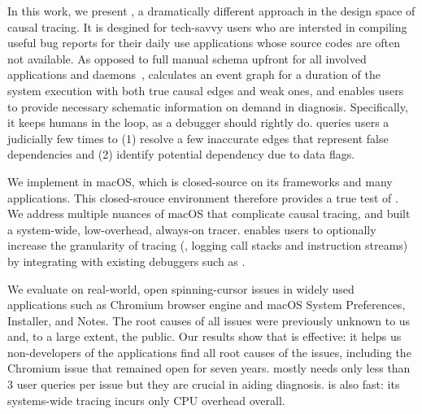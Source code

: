 In this work, we present \xxx, a dramatically different approach in the design
space of causal tracing. It is desgined for tech-savvy users who are intersted
in compiling useful bug reports for their daily use applications whose source
codes are often not available. As opposed to full manual schema upfront for
all involved applications and daemons~\cite{barham2004using, reynolds2006pip,
fonseca2007x}, \xxx calculates an event graph for a duration of the system
execution with both true causal edges and weak ones, and enables users to
provide necessary schematic information on demand in diagnosis.
Specifically, it keeps humans in the loop, as a debugger should rightly do. \xxx
queries users a judicially few times to (1) resolve a few inaccurate edges that
represent false dependencies and (2) identify potential dependency due to data
flags.

We implement \xxx in macOS, which is closed-source on its frameworks and many
applications. This closed-srouce environment therefore provides a true test
of \xxx. We address multiple nuances of macOS that complicate causal tracing,
and built a system-wide, low-overhead, always-on tracer. \xxx enables users to
optionally increase the granularity of tracing (\eg, logging call stacks and
instruction streams) by integrating with existing debuggers such as .

We evaluate \xxx on \nbug real-world, open spinning-cursor issues in widely
used applications such as Chromium browser engine and macOS System Preferences,
Installer, and Notes. The root causes of all \nbug issues were previously
unknown to us and, to a large extent, the public. Our results show that \xxx is
effective: it helps us non-developers of the applications find all root causes
of the issues, including the Chromium issue that remained open for seven years.
\xxx mostly needs only less than 3 user queries per issue but they are crucial
in aiding diagnosis. \xxx is also fast: its systems-wide tracing incurs only
\cpuoverhead CPU overhead overall.


